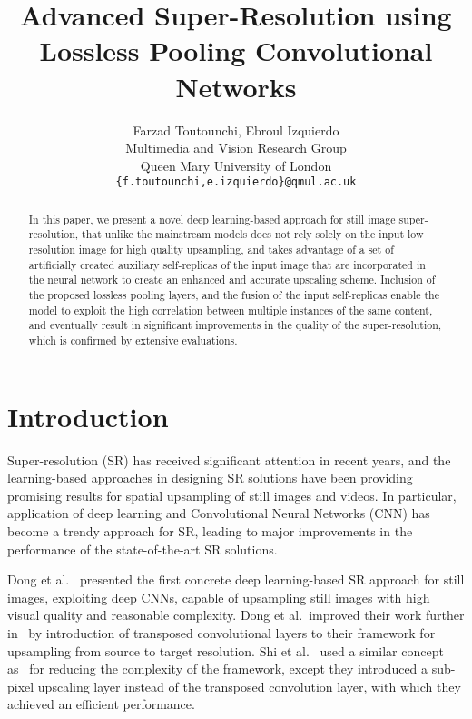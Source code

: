 \documentclass[10pt,twocolumn,letterpaper]{article}
\begin{document}
\title{Advanced Super-Resolution using Lossless Pooling Convolutional Networks}

\author{Farzad Toutounchi, Ebroul Izquierdo \\
Multimedia and Vision Research Group\\Queen Mary University of London\\
{\tt\small \{f.toutounchi,e.izquierdo\}@qmul.ac.uk}
}

\maketitle
\ifwacvfinal\thispagestyle{empty}\fi

\begin{abstract}
In this paper, we present a novel deep learning-based approach for still image
super-resolution, that unlike the mainstream models does not rely solely on the 
input low resolution image for high quality upsampling, and takes advantage
of a set of artificially created auxiliary self-replicas of the input image that
are incorporated in the neural network to create an enhanced and accurate 
upscaling scheme. Inclusion of the proposed lossless pooling layers, and the fusion
of the input self-replicas enable the model to exploit the high correlation
between multiple instances of the same content, and eventually result in significant
improvements in the quality of the super-resolution, which is confirmed
by extensive evaluations.

\end{abstract}

\section{Introduction}
\label{sec:intro}
Super-resolution (SR) has received significant attention in recent years, and the learning-based
approaches in designing SR solutions have been providing promising results for spatial
upsampling of still images and videos. In particular, application of deep learning and 
Convolutional Neural Networks (CNN) has become a trendy approach for SR, leading to
major improvements in the performance of the state-of-the-art SR solutions.

Dong et al.~\cite{dong2014,dong2016a} presented the first
concrete deep learning-based SR approach for still images, exploiting deep CNNs, capable 
of upsampling still images with high visual quality and reasonable complexity. 
Dong et al.~improved their work further in~\cite{dong2016b} 
by introduction of transposed convolutional layers to their framework for upsampling 
from source to target resolution.
Shi et al.~\cite{shi2016} used a similar concept as~\cite{dong2016b} for reducing the 
complexity of the framework, except they introduced a sub-pixel upscaling 
layer instead of the transposed convolution layer, with which 
they achieved an efficient performance.
\end{document}
